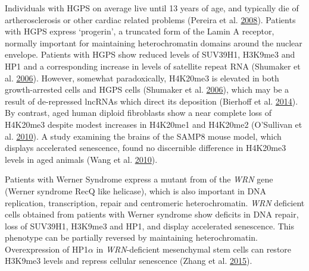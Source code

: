 \documentclass[onehalf,12pt]{beavtex}
\begin{document}
  Individuals with HGPS on average live until 13 years of age, and
  typically die of artherosclerosis or other cardiac related problems
  (Pereira et al.
  \protect\hyperlink{ref-PereiraHGPSrelatedpremature2008b}{2008}).
  Patients with HGPS express `progerin', a truncated form of the Lamin A
  receptor, normally important for maintaining heterochromatin domains
  around the nuclear envelope. Patients with HGPS show reduced levels of
  SUV39H1, H3K9me3 and HP1 and a corresponding increase in levels of
  satellite repeat RNA (Shumaker et al.
  \protect\hyperlink{ref-ShumakerMutantnuclearlamin2006}{2006}). However,
  somewhat paradoxically, H4K20me3 is elevated in both growth-arrested
  cells and HGPS cells (Shumaker et al.
  \protect\hyperlink{ref-ShumakerMutantnuclearlamin2006}{2006}), which may
  be a result of de-repressed lncRNAs which direct its deposition
  (Bierhoff et al.
  \protect\hyperlink{ref-BierhoffQuiescenceInducedLncRNAsTrigger2014}{2014}).
  By contrast, aged human diploid fibroblasts show a near complete loss of
  H4K20me3 despite modest increases in H4K20me1 and H4K20me2 (O'Sullivan
  et al.
  \protect\hyperlink{ref-OSullivanReducedhistonebiosynthesis2010}{2010}).
  A study examining the brains of the SAMP8 mouse model, which displays
  accelerated senescence, found no discernible difference in H4K20me3
  levels in aged animals (Wang et al.
  \protect\hyperlink{ref-WangIdentificationhistonemethylation2010}{2010}).
  
  Patients with Werner Syndrome express a mutant from of the \emph{WRN}
  gene (Werner syndrome RecQ like helicase), which is also important in
  DNA replication, transcription, repair and centromeric heterochromatin.
  \emph{WRN} deficient cells obtained from patients with Werner syndrome
  show deficits in DNA repair, loss of SUV39H1, H3K9me3 and HP1, and
  display accelerated senescence. This phenotype can be partially reversed
  by maintaining heterochromatin. Overexpression of HP1\(\alpha\) in
  \emph{WRN}-deficient mesenchymal stem cells can restore H3K9me3 levels
  and repress cellular senescence (Zhang et al.
  \protect\hyperlink{ref-ZhangWernersyndromestem2015}{2015}).
  
\end{document}
